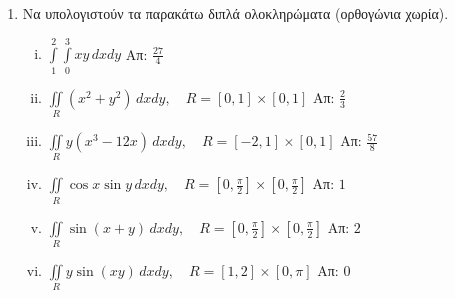 



\pagestyle{askhseis}
\everymath{\displaystyle}




\begin{center}
  \minibox{\large\bf \textcolor{Col1}{Ασκήσεις Διπλό Ολοκλήρωμα}}
\end{center}

\vspace{\baselineskip}

\begin{enumerate}
  \item Να υπολογιστούν τα παρακάτω διπλά ολοκληρώματα (ορθογώνια χωρία).
    \begin{enumerate}[i)]
      \item $\int\limits_1^2\!\!\!\int\limits_0^ 3xy\,dxdy$ 
        \hfill Απ: $\frac{27}{4}$ %
      \item $\iint\limits_{R}(x^2+y^2)\,dxdy,\quad R=[0,1]\times[0,1]$ 
        \hfill Απ: $\frac{2}{3}$ %
      \item $\iint\limits_{R}y(x^3-12x)\,dxdy,\quad R=[-2,1]\times[0,1]$ 
        \hfill Απ: $\frac{57}{8}$
      \item $\iint\limits_{R}\cos x\sin y\,dxdy,\quad 
        R=\left[0,\frac{\pi}{2}\right]\times\left[0,\frac{\pi}{2}\right]$ 
        \hfill Απ: $1$
      \item $\iint\limits_{R}\sin(x+y)\,dxdy, \quad 
        R=\left[0,\frac{\pi}{2}\right]\times\left[0,\frac{\pi}{2}\right]$ 
        \hfill Απ: $2$ %
      \item $ \iint\limits_{R}y\sin(xy)\,dxdy, \quad R=[1,2]\times[0,\pi] $ 
        \hfill Απ: $ 0 $ 
    \end{enumerate}


\end{enumerate}
